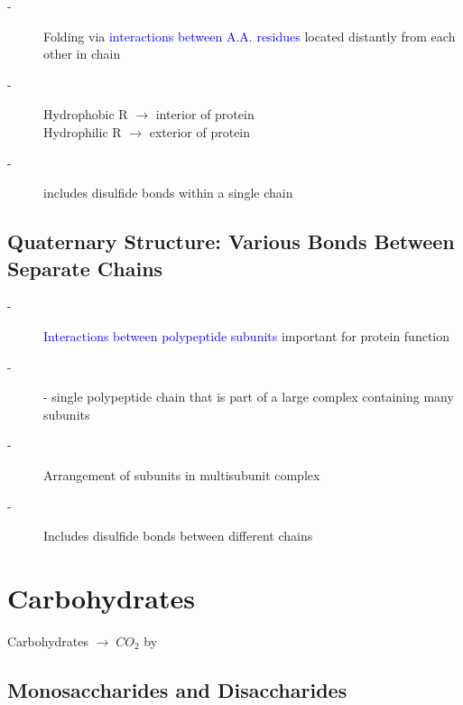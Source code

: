 \documentclass[../Bio_chemistryReview.tex]{subfiles}
\begin{document}
\begin{description}
  \item[-] Folding via \textcolor{blue}{interactions between A.A. residues}
    located distantly from each other in chain 
  \item[-] Hydrophobic R
    $\rightarrow$ interior of protein \hfill \\ Hydrophilic R $\rightarrow$
    exterior of protein 
  \item[-] includes disulfide bonds within a single chain
\end{description}

\subsection{Quaternary Structure: Various Bonds Between Separate Chains}

\begin{description}
  \item[-] \textcolor{blue}{Interactions between polypeptide subunits} important
    for protein function 
  \item[-]  - single polypeptide chain that
    is part of a large complex containing many subunits
  \item[-] Arrangement of subunits in multisubunit complex 
  \item[-] Includes
    disulfide bonds between different chains
\end{description}

\section{Carbohydrates}

Carbohydrates $\rightarrow \; CO_{2}$ by  

\subsection{Monosaccharides and Disaccharides\supddag}
\end{document}
